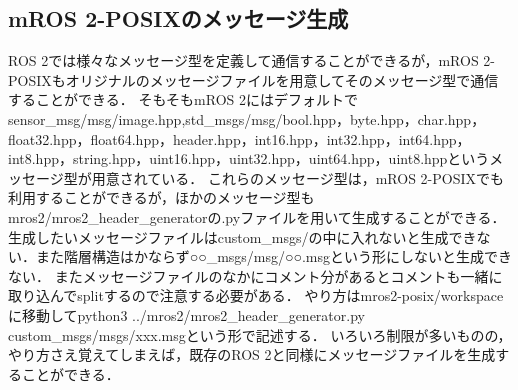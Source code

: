 \subsection{mROS 2-POSIXのメッセージ生成}
ROS 2では様々なメッセージ型を定義して通信することができるが，mROS 2-POSIXもオリジナルのメッセージファイルを用意してそのメッセージ型で通信することができる．
そもそもmROS 2にはデフォルトでsensor\_msg/msg/image.hpp,std\_msgs/msg/bool.hpp，byte.hpp，char.hpp，float32.hpp，float64.hpp，header.hpp，int16.hpp，int32.hpp，int64.hpp，int8.hpp，string.hpp，uint16.hpp，uint32.hpp，uint64.hpp，uint8.hppというメッセージ型が用意されている．
これらのメッセージ型は，mROS 2-POSIXでも利用することができるが，ほかのメッセージ型もmros2/mros2\_header\_generatorの.pyファイルを用いて生成することができる．
生成したいメッセージファイルはcustom\_msgs/の中に入れないと生成できない．また階層構造はかならず○○\_msgs/msg/○○.msgという形にしないと生成できない．
またメッセージファイルのなかにコメント分があるとコメントも一緒に取り込んでsplitするので注意する必要がある．
やり方はmros2-posix/workspaceに移動してpython3 ../mros2/mros2\_header\_generator.py custom\_msgs/msgs/xxx.msgという形で記述する．
いろいろ制限が多いものの，やり方さえ覚えてしまえば，既存のROS 2と同様にメッセージファイルを生成することができる．